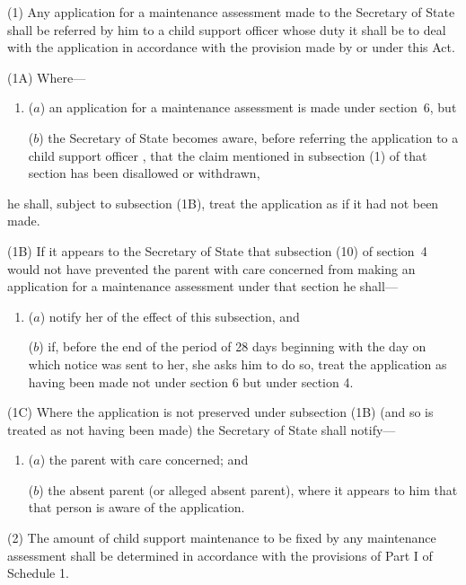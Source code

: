 \documentclass[12pt,a4paper]{article}
\begin{document}
(1) Any application for a maintenance assessment made to the Secretary of State shall be 
referred by him to a child support officer whose duty it shall be to deal with the application 
in accordance with the provision made by or under this Act.

(1A) Where—
\begin{enumerate}\item[]
($a$) an application for a maintenance assessment is made under section~6, but

($b$) the Secretary of State becomes aware, 
before referring the application to a child support officer%
, that the claim mentioned in subsection (1) of that section has been disallowed or withdrawn,
\end{enumerate}
he shall, subject to subsection (1B), treat the application as if it had not been made.

(1B) If it appears to the Secretary of State that subsection (10) of section~4 would not have prevented the parent with care concerned from making an application for a maintenance assessment under that section he shall—
\begin{enumerate}\item[]
($a$) notify her of the effect of this subsection, and

($b$) if, before the end of the period of 28 days beginning with the day on which notice was sent to her, she asks him to do so, treat the application as having been made not under section 6 but under section 4.
\end{enumerate}

(1C) Where the application is not preserved under subsection (1B) (and so is treated as not having been made) the Secretary of State shall notify—
\begin{enumerate}\item[]
($a$) the parent with care concerned; and

($b$) the absent parent (or alleged absent parent), where it appears to him that that person is aware of the application.
\end{enumerate}

(2) The amount of child support maintenance to be fixed by any maintenance assessment shall be determined in accordance with the provisions of Part I of Schedule 1.
\end{document}
